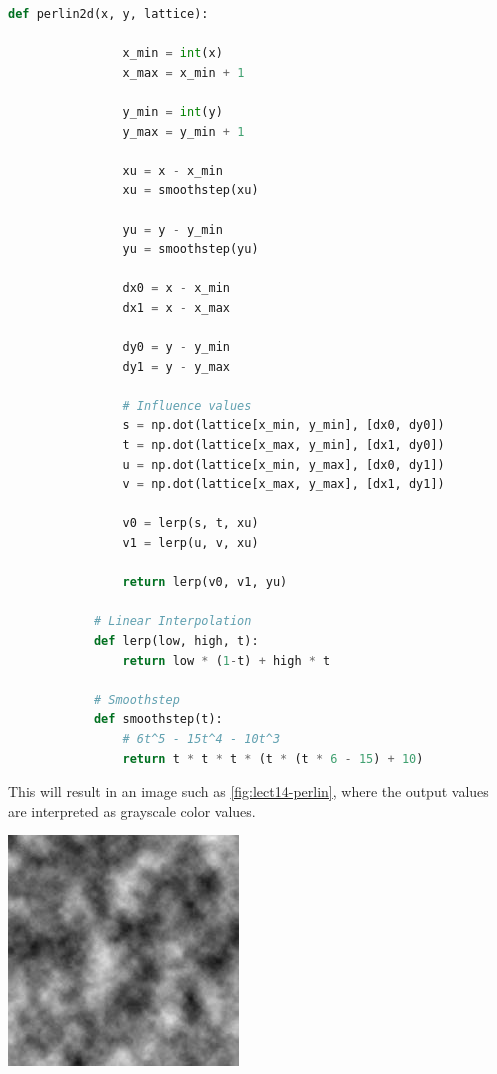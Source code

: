 \documentclass[10pt]{report}
\begin{document}
		\begin{lstlisting}[label={lst:2d-perlin}, language=Python, frame=none, caption={Two-dimensional Perlin noise.}, captionpos=b]
			def perlin2d(x, y, lattice):
			
				x_min = int(x)
				x_max = x_min + 1
				
				y_min = int(y)
				y_max = y_min + 1
				
				xu = x - x_min
				xu = smoothstep(xu)
				
				yu = y - y_min
				yu = smoothstep(yu)
				
				dx0 = x - x_min
				dx1 = x - x_max
				
				dy0 = y - y_min
				dy1 = y - y_max
				
				# Influence values
				s = np.dot(lattice[x_min, y_min], [dx0, dy0])
				t = np.dot(lattice[x_max, y_min], [dx1, dy0])
				u = np.dot(lattice[x_min, y_max], [dx0, dy1])
				v = np.dot(lattice[x_max, y_max], [dx1, dy1])
				
				v0 = lerp(s, t, xu)
				v1 = lerp(u, v, xu)
				
				return lerp(v0, v1, yu)
			
			# Linear Interpolation
			def lerp(low, high, t):
				return low * (1-t) + high * t
			
			# Smoothstep
			def smoothstep(t):
				# 6t^5 - 15t^4 - 10t^3
				return t * t * t * (t * (t * 6 - 15) + 10)
		\end{lstlisting}
	
		This will result in an image such as \autoref{fig:lect14-perlin}, where the output values are interpreted as grayscale color values. 
		
		\begin{minipage}{\textwidth}
			\centering
			\includegraphics[scale=1.0]{lect14-perlin}
			\label{fig:lect14-perlin}
		\end{minipage} 
		
\end{document}
